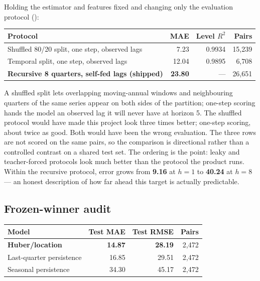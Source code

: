 \documentclass[11pt,a4paper]{article}
\begin{document}
Holding the estimator and features fixed and changing only the evaluation protocol ():

\begin{center}
\small
\begin{tabularx}{\linewidth}{@{}>{\raggedright\arraybackslash}Xrrr@{}}
\toprule
Protocol & MAE & Level \(R^2\) & Pairs \\
\midrule
Shuffled 80/20 split, one step, observed lags & 7.23 & 0.9934 & 15,239 \\
Temporal split, one step, observed lags & 12.04 & 0.9895 & 6,708 \\
\textbf{Recursive 8 quarters, self-fed lags (shipped)} & \textbf{23.80} & --- & 26,651 \\
\bottomrule
\end{tabularx}
\end{center}

A shuffled split lets overlapping moving-annual windows and neighbouring quarters of the same series appear on both sides of the partition; one-step scoring hands the model an observed lag it will never have at horizon 5. The shuffled protocol would have made this project look three times better; one-step scoring, about twice as good. Both would have been the wrong evaluation. The three rows are not scored on the same pairs, so the comparison is directional rather than a controlled contrast on a shared test set. The ordering is the point: leaky and teacher-forced protocols look much better than the protocol the product runs. Within the recursive protocol, error grows from \textbf{9.16} at \(h=1\) to \textbf{40.24} at \(h=8\) --- an honest description of how far ahead this target is actually predictable.

\subsection{Frozen-winner audit}

\begin{center}
\small
\begin{tabular}{@{}lrrr@{}}
\toprule
Model & Test MAE & Test RMSE & Pairs \\
\midrule
\textbf{Huber/location} & \textbf{14.87} & \textbf{28.19} & 2,472 \\
Last-quarter persistence & 16.85 & 29.51 & 2,472 \\
Seasonal persistence & 34.30 & 45.17 & 2,472 \\
\bottomrule
\end{tabular}
\end{center}
\end{document}

